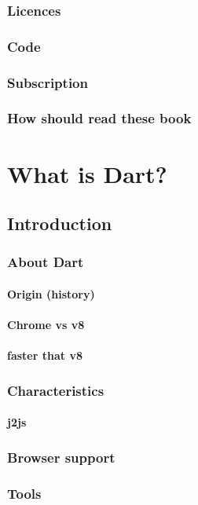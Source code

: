\documentclass[10pt]{book}
\begin{document}
\section{Licences}
\lipsum[3]
\section{Code}
\lipsum[4]
\section{Subscription}
\lipsum[5]
\section{How should read these book}
\lipsum[6]
%
\tableofcontents
%
\mainmatter
%
\part{What is Dart?}
\chapter{Introduction}
\lipsum[7]
\section{About Dart}
\lipsum[8]
\subsection{Origin  (history)}
\lipsum[9]
\subsection{Chrome vs v8}
\lipsum[10]
\subsection{faster that v8}
\lipsum[11]
\section{Characteristics}
\lipsum[12]
\subsection{j2js}
\lipsum[13]
\section{Browser support}
\lipsum[14]
\section{Tools}
\lipsum[15]
\end{document}
